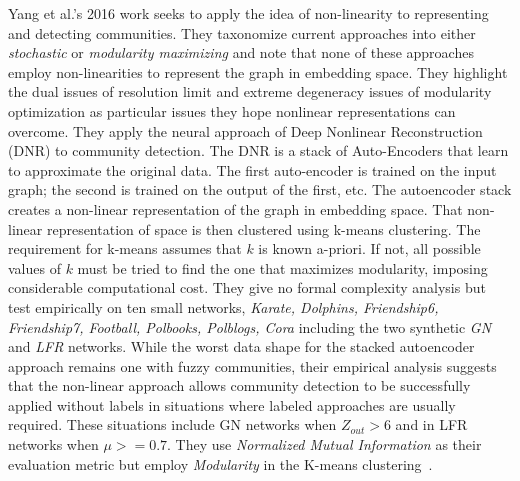 \par{Yang et al.'s 2016 work seeks to apply the idea of non-linearity to representing and detecting communities.
 They taxonomize current approaches into either \textit{stochastic} or \textit{modularity maximizing} and note that none of these approaches employ non-linearities to represent the graph in embedding space. 
 They highlight the dual issues of resolution limit and extreme degeneracy issues of modularity optimization as particular issues they hope nonlinear representations can overcome. 
 They apply the neural approach of Deep Nonlinear Reconstruction (DNR) to community detection. 
 The DNR is a stack of Auto-Encoders that learn to approximate the original data. 
 The first auto-encoder is trained on the input graph; the second is trained on the output of the first, etc. 
 The autoencoder stack creates a non-linear representation of the graph in embedding space. 
 That non-linear representation of space is then clustered using k-means clustering. 
 The requirement for k-means assumes that $k$ is known a-priori. 
 If not, all possible values of $k$ must be tried to find the one that maximizes modularity, imposing considerable computational cost. 
 They give no formal complexity analysis but test empirically on ten small networks, \textit{Karate, Dolphins, Friendship6, Friendship7, Football, Polbooks, Polblogs, Cora} including the two synthetic \textit{GN} and \textit{LFR} networks. 
 While the worst data shape for the stacked autoencoder approach remains one with fuzzy communities, their empirical analysis suggests that the non-linear approach allows community detection to be successfully applied without labels in situations where labeled approaches are usually required. 
 These situations include GN networks when $Z_{out} > 6$ and in LFR networks when $\mu >= 0.7$. 
 They use \textit{Normalized Mutual Information} as their evaluation metric but employ \textit{Modularity} in the K-means clustering~\cite{Yang2016}.}

